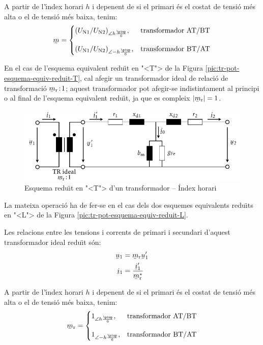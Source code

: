 A partir de l'\'{\i}ndex horari $h$ i depenent de si el primari \'{e}s el costat de tensi\'{o} m\'{e}s alta o el de tensi\'{o} m\'{e}s baixa, tenim:
\begin{equation}
\cmplx{m} = \begin{cases}
     (U\ped{N1}/U\ped{N2})_{\angle h \frac{\piup}{6}}, & \text{transformador AT/BT}\\[2.7ex]
     (U\ped{N1}/U\ped{N2})_{\angle -h \frac{\piup}{6}}, & \text{transformador BT/AT}
\end{cases}
\label{eq:rel-transf-cmplx}
\end{equation}

En el cas de l'esquema equivalent redu\"{\i}t en {"<}T{">} de la Figura \vref{pic:tr-pot-esquema-equiv-reduit-T}, cal afegir un transformador ideal de relaci\'{o} de transformaci\'{o}  $\cmplx{m}\ped{r}\!:\!1$; aquest transformador pot afegir-se indistintament  al principi o al final de l'esquema equivalent redu\"{\i}t, ja que es compleix $|\cmplx{m}\ped{r}|=1$.
\begin{figure}[htb]
\centering
    \includegraphics{Imatges/Cap-TrafosPot-Esq-Equiv-Reduit-T-Complex.pdf}
\caption{Esquema redu\"{\i}t en {"<}T{">} d'un transformador -- \'{I}ndex horari}
\label{fig:esq-reduit-T-complex}
\end{figure}

La mateixa operaci\'{o} ha de fer-se en el cas dels dos esquemes equivalents redu\"{\i}ts en {"<}L{">} de la Figura \vref{pic:tr-pot-esquema-equiv-reduit-L}.

Les relacions entre les tensions i corrents de primari i secundari d'aquest transformador ideal redu\"{\i}t s\'{o}n:
\begin{subequations}
\begin{align}
    \cmplx{u}_1 &= \cmplx{m}\ped{r}\cmplx{u}'_1\\  \cmplx{i}_1 &= \frac{\cmplx{i}'_1}{\cmplx{m}^*\ped{r}}
\end{align}
\end{subequations}

A partir de l'\'{\i}ndex horari $h$ i depenent de si el primari \'{e}s el costat de tensi\'{o} m\'{e}s alta o el de tensi\'{o} m\'{e}s baixa, tenim:
\begin{equation}
\cmplx{m}\ped{r} = \begin{cases}
      1_{\angle h\frac{\piup}{6}}, & \text{transformador AT/BT}\\[2.7ex]
      1_{\angle -h\frac{\piup}{6}}, & \text{transformador BT/AT}
\end{cases}
\label{eq:rel-transf-cmplx-reduit}
\end{equation}

